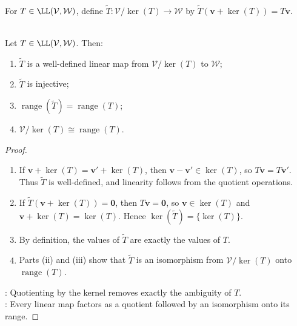 \begin{definition} \\
For $T\in\LL(\mathcal{V},\mathcal{W})$, define $\widetilde{T}:\mathcal{V}/\ker(T)\to\mathcal{W}$ by $\widetilde{T}(\mathbf{v}+\ker(T))=T\mathbf{v}$.
\end{definition}

\begin{theorem} \label{thm:quotient-by-kernel-is-range} \\
Let $T\in\LL(\mathcal{V},\mathcal{W})$. Then:
\begin{enumerate}[label=(\roman*)]
\setlength{\itemsep}{0pt}
\item $\widetilde{T}$ is a well-defined linear map from $\mathcal{V}/\ker(T)$ to $\mathcal{W}$;
\item $\widetilde{T}$ is injective;
\item $\operatorname{range}(\widetilde{T})=\operatorname{range}(T)$;
\item $\mathcal{V}/\ker(T)\cong\operatorname{range}(T)$.
\end{enumerate}
\begin{proof}
\begin{enumerate}[label=(\roman*)]
\setlength{\itemsep}{0pt}
\item If $\mathbf{v}+\ker(T)=\mathbf{v}'+\ker(T)$, then $\mathbf{v}-\mathbf{v}'\in\ker(T)$, so $T\mathbf{v}=T\mathbf{v}'$. Thus $\widetilde{T}$ is well-defined, and linearity follows from the quotient operations.
\item If $\widetilde{T}(\mathbf{v}+\ker(T))=\mathbf{0}$, then $T\mathbf{v}=\mathbf{0}$, so $\mathbf{v}\in\ker(T)$ and $\mathbf{v}+\ker(T)=\ker(T)$. Hence $\ker(\widetilde{T})=\{\ker(T)\}$.
\item By definition, the values of $\widetilde{T}$ are exactly the values of $T$.
\item Parts (ii) and (iii) show that $\widetilde{T}$ is an isomorphism from $\mathcal{V}/\ker(T)$ onto $\operatorname{range}(T)$.
\end{enumerate}
: Quotienting by the kernel removes exactly the ambiguity of $T$.\\
: Every linear map factors as a quotient followed by an isomorphism onto its range.
\end{proof}
\end{theorem}

